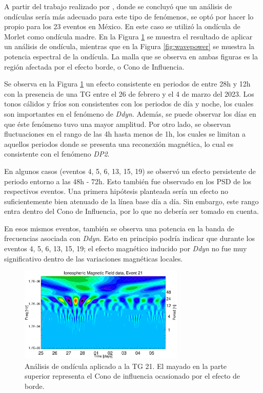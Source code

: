 A partir del trabajo realizado por \cite{2021amory}, donde se concluyó que un análisis de ondículas sería más adecuado para este tipo de fenómenos, se optó por hacer lo propio para los 23 eventos en México. En este caso se utilizó la ondícula de Morlet como ondícula madre. En la Figura \ref{fig:wave} se muestra el resultado de aplicar un análisis de ondícula, mientras que en la Figura \ref{fig:wavepower} se muestra la potencia espectral de la ondícula. La malla que se observa en ambas figuras es la región afectada por el efecto borde, o Cono de Influencia. 
\vspace{1 em}

Se observa en la Figura \ref{fig:wave} un efecto consistente en periodos de entre 28h y 12h con la presencia de una TG entre el 26 de febrero y el 4 de marzo del 2023. Los tonos cálidos y fríos son consistentes con los periodos de día y noche, los cuales son importantes en el fenómeno de \emph{Ddyn}. Además, se puede observar los días en que éste fenómeno tuvo una mayor amplitud. Por otro lado, se observan fluctuaciones en el rango de las 4h hasta menos de 1h, los cuales se limitan a aquellos periodos donde se presenta una reconexión magnética, lo cual es consistente con el fenómeno \emph{DP2}. 
\vspace{1 em}

En algunos casos (eventos 4, 5, 6, 13, 15, 19) se observó un efecto persistente de periodo entorno a las 48h - 72h. Esto también fue observado en los PSD de los respectivos eventos. Una primera hipótesis planteada sería un efecto no suficientemente bien atenuado de la línea base día a día. Sin embargo, este rango entra dentro del Cono de Influencia, por lo que no debería ser tomado en cuenta.  
\vspace{1 em}

En esos mismos eventos, también se observa una potencia en la banda de frecuencias asociada con \emph{Ddyn}. Esto en principio podría indicar que durante los eventos 4, 5, 6, 13, 15, 19; el efecto magnético inducido por \emph{Ddyn} no fue muy significativo dentro de las variaciones magnéticas locales. 
\vspace{1 em}



\begin{figure}
    \centering
     \includegraphics[width=0.7\textwidth]{Images/cap2/wave/wave_2023-02-25.uncut.eps}
      \caption{Análisis de ondícula aplicado a la TG 21. El mayado en la parte superior representa el Cono de influencia ocasionado por el efecto de borde.}
       \label{fig:wave}
\end{figure}

